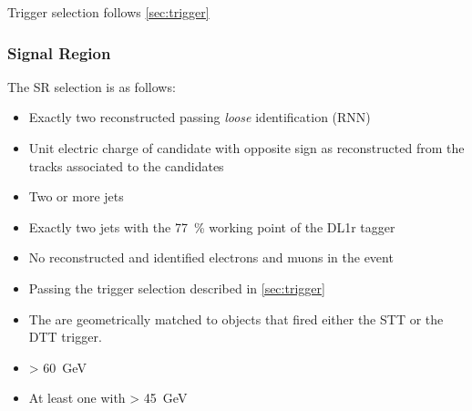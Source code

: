 Trigger selection follows \cref{sec:trigger}

\subsubsection{Signal Region}

The SR selection is as follows:
\begin{itemize}
\item Exactly two reconstructed \tauhadvis passing \textit{loose} identification
  (RNN)

\item Unit electric charge of \tauhadvis candidate with opposite sign as
  reconstructed from the tracks associated to the \tauhadvis candidates

\item Two or more jets

\item Exactly two \btagged jets with the \SI{77}{\percent} working point of the
  DL1r tagger

\item No reconstructed and identified electrons and muons in the event

\item Passing the trigger selection described in \cref{sec:trigger}

\item The \tauhadvis are geometrically matched to objects that fired either the
  STT or the DTT trigger.

\item \mMMC > \SI{60}{\GeV}

\item At least one \bjet with \pT > \SI{45}{\GeV} 
\end{itemize}


